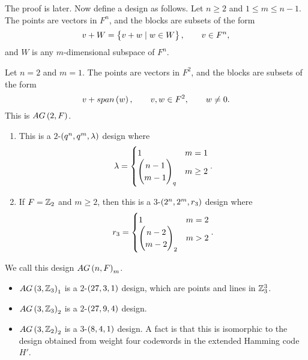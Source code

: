 The proof is later. Now define a design as follows. Let $ n \ge 2 $ and $ 1 \le m \le n - 1 $. The points are vectors in $ F^n $, and the blocks are subsets of the form
$$ v + W = \cbr{v + w \mid w \in W}, \qquad v \in F^n, $$
and $ W $ is any $ m $-dimensional subspace of $ F^n $.

\begin{example*}
Let $ n = 2 $ and $ m = 1 $. The points are vectors in $ F^2 $, and the blocks are subsets of the form
$$ v + span\br{w}, \qquad v, w \in F^2, \qquad w \ne 0. $$
This is $ AG\br{2, F} $.
\end{example*}

\begin{proposition}
\label{prop:3.17}
\hfill
\begin{enumerate}
\item This is a $ 2 $-$ \br{q^n, q^m, \lambda} $ design where
$$ \lambda =
\begin{cases}
1 & m = 1 \\
\begin{pmatrix} n - 1 \\ m - 1 \end{pmatrix}_q & m \ge 2
\end{cases}.
$$
\item If $ F = \mathbb{Z}_2 $ and $ m \ge 2 $, then this is a $ 3 $-$ \br{2^n, 2^m, r_3} $ design where
$$ r_3 =
\begin{cases}
1 & m = 2 \\
\begin{pmatrix} n - 2 \\ m - 2 \end{pmatrix}_2 & m > 2
\end{cases}.
$$
\end{enumerate}
\end{proposition}

We call this design $ AG\br{n, F}_m $.

\pagebreak

\begin{example*}
\hfill
\begin{itemize}
\item $ AG\br{3, \Z_3}_1 $ is a $ 2 $-$ \br{27, 3, 1} $ design, which are points and lines in $ \mathbb{Z}_3^3 $.
\item $ AG\br{3, \Z_3}_2 $ is a $ 2 $-$ \br{27, 9, 4} $ design.
\item $ AG\br{3, \Z_2}_2 $ is a $ 3 $-$ \br{8, 4, 1} $ design. A fact is that this is isomorphic to the design obtained from weight four codewords in the extended Hamming code $ H' $.
\end{itemize}
\end{example*}

